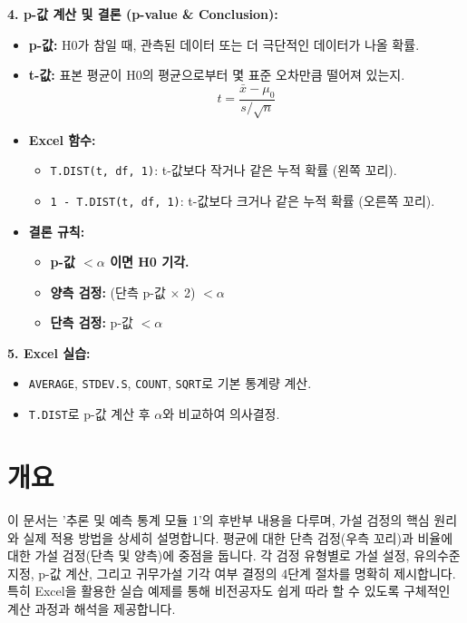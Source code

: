 \documentclass[11pt,a4paper]{article}
\theoremstyle{definition}
\begin{document}
\begin{tcolorbox}[colback=lightblue, colframe=darkblue, title=\textbf{모듈 1 핵심 요약: 가설 검정의 기초}]
\textbf{4. p-값 계산 및 결론 (p-value & Conclusion):}
\begin{itemize}
    \item \textbf{p-값:} H0가 참일 때, 관측된 데이터 또는 더 극단적인 데이터가 나올 확률.
    \item \textbf{t-값:} 표본 평균이 H0의 평균으로부터 몇 표준 오차만큼 떨어져 있는지.
        \[ t = \frac{\bar{x} - \mu_0}{s / \sqrt{n}} \]
    \item \textbf{Excel 함수:}
        \begin{itemize}
            \item \texttt{T.DIST(t, df, 1)}: t-값보다 작거나 같은 누적 확률 (왼쪽 꼬리).
            \item \texttt{1 - T.DIST(t, df, 1)}: t-값보다 크거나 같은 누적 확률 (오른쪽 꼬리).
        \end{itemize}
    \item \textbf{결론 규칙:}
        \begin{itemize}
            \item \textbf{p-값 $< \alpha$ 이면 H0 기각.}
            \item \textbf{양측 검정:} (단측 p-값 $\times$ 2) $< \alpha$
            \item \textbf{단측 검정:} p-값 $< \alpha$
        \end{itemize}
\end{itemize}

\textbf{5. Excel 실습:}
\begin{itemize}
    \item \texttt{AVERAGE}, \texttt{STDEV.S}, \texttt{COUNT}, \texttt{SQRT}로 기본 통계량 계산.
    \item \texttt{T.DIST}로 p-값 계산 후 $\alpha$와 비교하여 의사결정.
\end{itemize}
\end{tcolorbox}

\newpage
\section*{개요}
이 문서는 '추론 및 예측 통계 모듈 1'의 후반부 내용을 다루며, 가설 검정의 핵심 원리와 실제 적용 방법을 상세히 설명합니다. 평균에 대한 단측 검정(우측 꼬리)과 비율에 대한 가설 검정(단측 및 양측)에 중점을 둡니다. 각 검정 유형별로 가설 설정, 유의수준 지정, p-값 계산, 그리고 귀무가설 기각 여부 결정의 4단계 절차를 명확히 제시합니다. 특히 Excel을 활용한 실습 예제를 통해 비전공자도 쉽게 따라 할 수 있도록 구체적인 계산 과정과 해석을 제공합니다.
\end{document}
